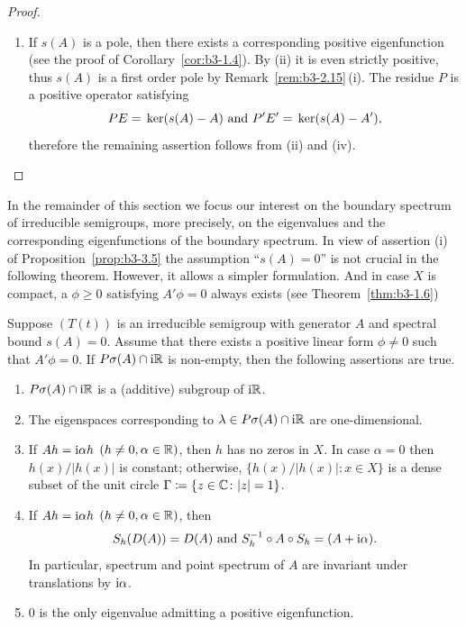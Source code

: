 \begin{proof}
\begin{enumerate}[\upshape (i), wide, labelindent=.25em]
	\item 
	If\/ $s(A)$ is a pole, then there exists a corresponding positive eigenfunction (see the proof of Corollary~\ref{cor:b3-1.4}).
	By (ii) it is even strictly positive, thus $s(A)$ is a first order pole by Remark~\ref{rem:b3-2.15}\,(i).
	The residue $P$ is a positive operator satisfying 
    \[
    PE = \mathop{}\mathrm{ker}(s(A) - A) \text{ and } P'E' = \mathop{}\mathrm{ker}(s(A) - A') , 
    \]
    therefore the remaining assertion follows from (ii) and (iv).
    \qedhere
	\end{enumerate}
	\end{proof}
In the remainder of this section we focus our interest on the boundary spectrum of irreducible semigroups, more precisely, on the eigenvalues and the corresponding eigenfunctions of the boundary spectrum. 
In view of assertion (i) of Proposition~\ref{prop:b3-3.5} the assumption \enquote{$s(A) = 0$} is not crucial in the following theorem. 
However, it allows a simpler formulation. 
And in case $X$ is compact, a $\phi \geq 0$ satisfying $A'\phi = 0$ always exists (see Theorem~\ref{thm:b3-1.6})
\begin{theorem}\label{thm:b3-3.6}
%
	Suppose $(T(t))$ is an irreducible semigroup with generator $A$ and spectral bound $s(A) = 0$.
	Assume that there exists a positive linear form $\phi \neq 0$ such that $A'\phi = 0$. 
	If\/ $P\sigma(A)\cap \mathrm{i}\mathbb{R}$ is non-empty, then the following assertions are true.
	\begin{enumerate}[\upshape (i)]
		\item 
		$P\sigma(A)\cap \mathrm{i}\mathbb{R}$ is a (additive) subgroup of\/ $\mathrm{i} \mathbb{R}$.
	
		\item 
		The eigenspaces corresponding to $\lambda \in P\sigma(A)\cap \mathrm{i}\mathbb{R}$ are one-dimensional.
	
		\item 
		If\/ $Ah = \mathrm{i}\alpha h$ $(h \neq 0, \alpha \in \mathbb{R})$, then $h$ has no zeros in $X$.
		In case $\alpha = 0$ then $h(x)/|h(x)|$ is constant; otherwise, $\{h(x)/|h(x)| \colon x \in X\}$ is a dense subset of the unit circle\/ $\Gamma \coloneq \{z\in \mathbb{C} \colon |z|=1\}$.
	
		\item 
		If\/ $Ah = \mathrm{i}\alpha h$ $(h \neq 0, \alpha \in \mathbb{R})$, then
		\begin{equation}\label{eq:b3-3.5}
			S_{h}(D(A)) = D(A) \text{ and } S_{h}^{-1}\circ A \circ S_{h} = (A + \mathrm{i}\alpha).
		\end{equation}
		In particular, spectrum and point spectrum of\/ $A$ are invariant under translations by $\mathrm{i} \alpha$.
	
		\item 
		$0$ is the only eigenvalue admitting a positive eigenfunction.
	\end{enumerate}
\end{theorem}

